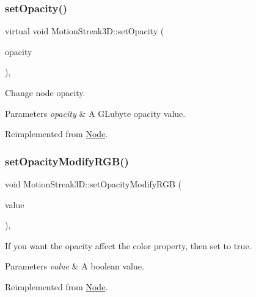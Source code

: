 \subsubsection{\texorpdfstring{set\+Opacity()}{setOpacity()}\hspace{0.1cm}{\footnotesize\ttfamily [2/2]}}
{\footnotesize\ttfamily virtual void Motion\+Streak3\+D\+::set\+Opacity (\begin{DoxyParamCaption}\item[{G\+Lubyte}]{opacity }\end{DoxyParamCaption})\hspace{0.3cm}{\ttfamily [override]}, {\ttfamily [virtual]}}

Change node opacity. 
\begin{DoxyParams}{Parameters}
{\em opacity} & A G\+Lubyte opacity value. \\
\hline
\end{DoxyParams}


Reimplemented from \hyperlink{classNode_ae41a9db63bfa3d466ee7c9d79c35352d}{Node}.

\mbox{\label{classMotionStreak3D_ac4ef49b3087c63f5cea40efe91d4f271}} 
\subsubsection{\texorpdfstring{set\+Opacity\+Modify\+R\+G\+B()}{setOpacityModifyRGB()}\hspace{0.1cm}{\footnotesize\ttfamily [1/2]}}
{\footnotesize\ttfamily void Motion\+Streak3\+D\+::set\+Opacity\+Modify\+R\+GB (\begin{DoxyParamCaption}\item[{bool}]{value }\end{DoxyParamCaption})\hspace{0.3cm}{\ttfamily [override]}, {\ttfamily [virtual]}}

If you want the opacity affect the color property, then set to true. 
\begin{DoxyParams}{Parameters}
{\em value} & A boolean value. \\
\hline
\end{DoxyParams}


Reimplemented from \hyperlink{classNode_a978c5435ab23f76e9efdf0f7e9e288e5}{Node}.

